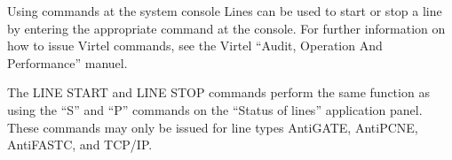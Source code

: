 \documentclass[letterpaper,10pt,english]{sphinxmanual}
\begin{document}
\ignorespaces 
{}

Using commands at the system console Lines can be used to start or stop a line by entering the appropriate command at the console. For further information on how to issue Virtel commands, see the Virtel “Audit, Operation And Performance” manuel.

\begin{sphinxVerbatim}[commandchars=\\\{\}]
  
  

        
\end{sphinxVerbatim}

The LINE START and LINE STOP commands perform the same function as using the “S” and “P” commands on the “Status of lines” application panel. These commands may only be issued for line types AntiGATE, AntiPCNE, AntiFASTC, and TCP/IP.

\ignorespaces 
\end{document}

